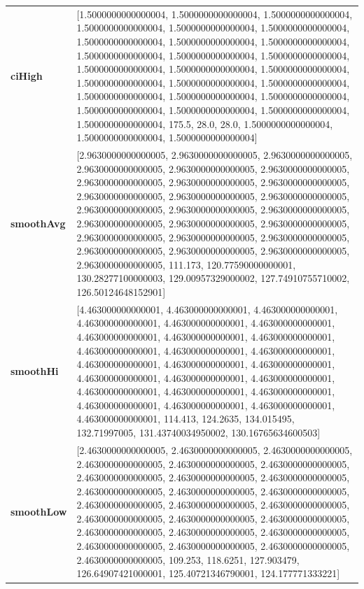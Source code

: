 						\begin{table}[H]
							\centering
							\begin{tabularx}{\textwidth}{lX}
		\textbf{ciHigh}& [1.5000000000000004, 1.5000000000000004, 1.5000000000000004, 1.5000000000000004, 1.5000000000000004, 1.5000000000000004, 1.5000000000000004, 1.5000000000000004, 1.5000000000000004, 1.5000000000000004, 1.5000000000000004, 1.5000000000000004, 1.5000000000000004, 1.5000000000000004, 1.5000000000000004, 1.5000000000000004, 1.5000000000000004, 1.5000000000000004, 1.5000000000000004, 1.5000000000000004, 1.5000000000000004, 1.5000000000000004, 1.5000000000000004, 1.5000000000000004, 1.5000000000000004, 175.5, 28.0, 28.0, 1.5000000000000004, 1.5000000000000004, 1.5000000000000004] \\
		\textbf{smoothAvg}&  [2.9630000000000005, 2.9630000000000005, 2.9630000000000005, 2.9630000000000005, 2.9630000000000005, 2.9630000000000005, 2.9630000000000005, 2.9630000000000005, 2.9630000000000005, 2.9630000000000005, 2.9630000000000005, 2.9630000000000005, 2.9630000000000005, 2.9630000000000005, 2.9630000000000005, 2.9630000000000005, 2.9630000000000005, 2.9630000000000005, 2.9630000000000005, 2.9630000000000005, 2.9630000000000005, 2.9630000000000005, 2.9630000000000005, 2.9630000000000005, 2.9630000000000005, 111.173, 120.77590000000001, 130.28277100000003, 129.00957329000002, 127.74910755710002, 126.50124648152901]\\
		\textbf{smoothHi}& [4.463000000000001, 4.463000000000001, 4.463000000000001, 4.463000000000001, 4.463000000000001, 4.463000000000001, 4.463000000000001, 4.463000000000001, 4.463000000000001, 4.463000000000001, 4.463000000000001, 4.463000000000001, 4.463000000000001, 4.463000000000001, 4.463000000000001, 4.463000000000001, 4.463000000000001, 4.463000000000001, 4.463000000000001, 4.463000000000001, 4.463000000000001, 4.463000000000001, 4.463000000000001, 4.463000000000001, 4.463000000000001, 114.413, 124.2635, 134.015495, 132.71997005, 131.43740034950002, 130.16765634600503] \\
		\textbf{smoothLow} &[2.4630000000000005, 2.4630000000000005, 2.4630000000000005, 2.4630000000000005, 2.4630000000000005, 2.4630000000000005, 2.4630000000000005, 2.4630000000000005, 2.4630000000000005, 2.4630000000000005, 2.4630000000000005, 2.4630000000000005, 2.4630000000000005, 2.4630000000000005, 2.4630000000000005, 2.4630000000000005, 2.4630000000000005, 2.4630000000000005, 2.4630000000000005, 2.4630000000000005, 2.4630000000000005, 2.4630000000000005, 2.4630000000000005, 2.4630000000000005, 2.4630000000000005, 109.253, 118.6251, 127.903479, 126.64907421000001, 125.40721346790001, 124.177771333221]\\
		
	\end{tabularx} 
\end{table}

